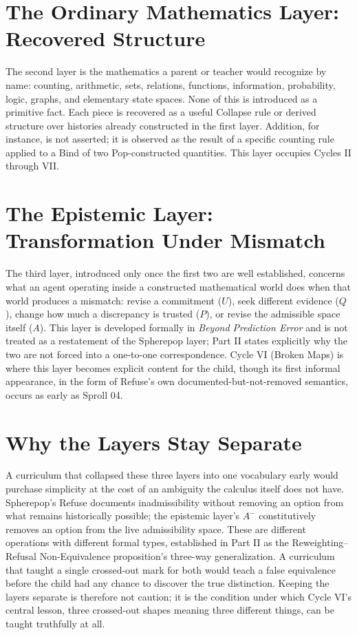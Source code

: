\documentclass[11pt,twoside]{book}
\begin{document}
\section{The Ordinary Mathematics Layer: Recovered Structure}

The second layer is the mathematics a parent or teacher would recognize by name: counting, arithmetic, sets, relations, functions, information, probability, logic, graphs, and elementary state spaces. None of this is introduced as a primitive fact. Each piece is recovered as a useful Collapse rule or derived structure over histories already constructed in the first layer. Addition, for instance, is not asserted; it is observed as the result of a specific counting rule applied to a Bind of two Pop-constructed quantities. This layer occupies Cycles II through VII.

\section{The Epistemic Layer: Transformation Under Mismatch}

The third layer, introduced only once the first two are well established, concerns what an agent operating inside a constructed mathematical world does when that world produces a mismatch: revise a commitment ($U$), seek different evidence ($Q$), change how much a discrepancy is trusted ($P$), or revise the admissible space itself ($A$). This layer is developed formally in \emph{Beyond Prediction Error} and is not treated as a restatement of the Spherepop layer; Part II states explicitly why the two are not forced into a one-to-one correspondence. Cycle VI (Broken Maps) is where this layer becomes explicit content for the child, though its first informal appearance, in the form of Refuse's own documented-but-not-removed semantics, occurs as early as Sproll 04.

\section{Why the Layers Stay Separate}

A curriculum that collapsed these three layers into one vocabulary early would purchase simplicity at the cost of an ambiguity the calculus itself does not have. Spherepop's Refuse documents inadmissibility without removing an option from what remains historically possible; the epistemic layer's $A^-$ constitutively removes an option from the live admissibility space. These are different operations with different formal types, established in Part II as the Reweighting--Refusal Non-Equivalence proposition's three-way generalization. A curriculum that taught a single crossed-out mark for both would teach a false equivalence before the child had any chance to discover the true distinction. Keeping the layers separate is therefore not caution; it is the condition under which Cycle VI's central lesson, three crossed-out shapes meaning three different things, can be taught truthfully at all.
\end{document}
